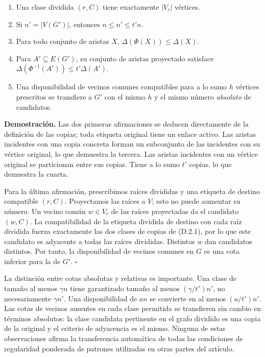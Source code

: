 \documentclass[spanish,11pt,a4paper]{article}
\providecommand{\tightlist}{\setlength{\itemsep}{0pt}\setlength{\parskip}{0pt}}
\begin{document}
\begin{enumerate}
\def\labelenumi{\arabic{enumi}.}
\tightlist
\item
  Una clase dividida \((r,C)\) tiene exactamente \(|V_r|\) vértices.
\item
  Si \(n'=|V(G')|\), entonces \(n\le n'\le t'n\).
\item
  Para todo conjunto de aristas \(X\), \(\Delta(\Phi(X))\le\Delta(X)\).
\item
  Para \(A'\subseteq E(G')\), su conjunto de aristas proyectado satisface \(\Delta(\Phi^{-1}(A'))\le t'\Delta(A')\).
\item
  Una disponibilidad de vecinos comunes compatibles para a lo sumo \(h\) vértices prescritos se transfiere a \(G'\) con el mismo \(h\) y el mismo número \emph{absoluto} de candidatos.
\end{enumerate}

\textbf{Demostración.} Las dos primeras afirmaciones se deducen directamente de la definición de las copias; toda etiqueta original tiene un enlace activo. Las aristas incidentes con una copia concreta forman un subconjunto de las incidentes con su vértice original, lo que demuestra la tercera. Las aristas incidentes con un vértice original se particionan entre sus copias. Tiene a lo sumo \(t'\) copias, lo que demuestra la cuarta.

Para la última afirmación, prescribimos raíces divididas y una etiqueta de destino compatible \((r,C)\). Proyectamos las raíces a \(V\); esto no puede aumentar su número. Un vecino común \(w\in V_r\) de las raíces proyectadas da el candidato \((w,C)\). La compatibilidad de la etiqueta dividida de destino con cada raíz dividida fuerza exactamente las dos clases de copias de (D.2.1), por lo que este candidato es adyacente a todas las raíces divididas. Distintos \(w\) dan candidatos distintos. Por tanto, la disponibilidad de vecinos comunes en \(G\) es una cota inferior para la de \(G'\). \(\square\)

La distinción entre cotas absolutas y relativas es importante. Una clase de tamaño al menos \(\gamma n\) tiene garantizado tamaño al menos \((\gamma/t')n'\), no necesariamente \(\gamma n'\). Una disponibilidad de \(an\) se convierte en al menos \((a/t')n'\). Las cotas de vecinos ausentes en cada clase permitida se transfieren sin cambio en términos absolutos: la clase candidata pertinente en el grafo dividido es una copia de la original y el criterio de adyacencia es el mismo. Ninguna de estas observaciones afirma la transferencia automática de todas las condiciones de regularidad ponderada de patrones utilizadas en otras partes del artículo.
\end{document}
